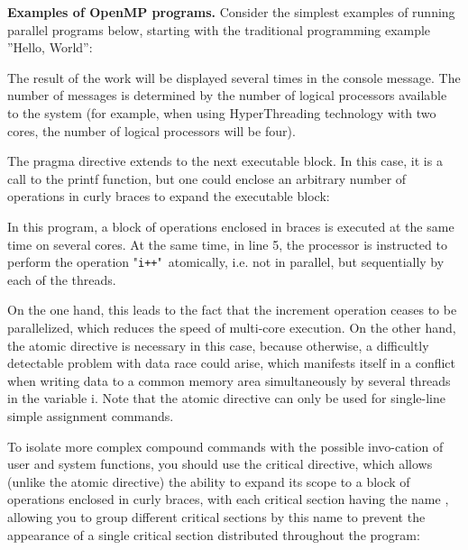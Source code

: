 {	\par\textbf{Examples of OpenMP programs.} Consider the simplest examples of running parallel programs below, starting with the traditional programming example ''Hello, World'':
	\begin{figure}[H]
		
	\end{figure}
	\par The result of the work will be displayed several times in the console message. The number of messages is determined by the number of logical processors available to the system (for example, when using HyperThreading technology with two cores, the number of logical processors will be four). 
	\par The pragma directive extends to the next executable block. In this case, it is a call to the printf function, but one could enclose an arbitrary number of operations in curly braces to expand the executable block:
	\begin{figure}[H]
		
	\end{figure}
	In this program, a block of operations enclosed in braces is executed at the same time on several cores. At the same time, in line 5, the processor is instructed to perform the operation "\texttt{i++}"\ atomically, i.e. not in parallel, but sequentially by each of the threads.
	\par On the one hand, this leads to the fact that the increment operation ceases to be parallelized, which reduces the speed of multi-core execution. On the other hand, the atomic directive is necessary in this case, because otherwise, a difficultly detectable problem with data race could arise, which manifests itself in a conflict when writing data to a common memory area simultaneously by several threads in the variable i. Note that the atomic directive can only be used for single-line simple assignment commands.
	\par To isolate more complex compound commands with the possible invo-cation of user and system functions, you should use the critical directive, which allows (unlike the atomic directive) the ability to expand its scope to a block of operations enclosed in curly braces, with each critical section having the name , allowing you to group different critical sections by this name to prevent the appearance of a single critical section distributed throughout the program:
	\begin{figure}[H]
		
	\end{figure}
}
